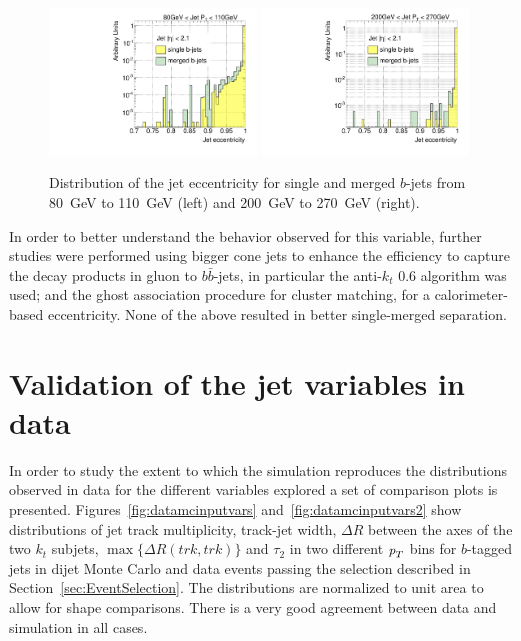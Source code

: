 \begin{figure}[tp]
\centering
\includegraphics[width=0.49\textwidth]{FIGS/VarsSingleMerged/JetEcc080.pdf}
\includegraphics[width=0.49\textwidth]{FIGS/VarsSingleMerged/JetEcc200.pdf}
\caption{Distribution of the jet eccentricity for single and merged $b$-jets from 80~GeV to 110~GeV (left) and 200~GeV to 270~GeV (right).}
\label{fig:jeteccsinglemerged}
\end{figure}


In order to better understand the behavior observed for this variable, further studies were performed using bigger cone jets to enhance the efficiency to capture the decay products in gluon to $b \bar{b}$-jets, in particular the anti-$k_t$ 0.6 algorithm was used; and the ghost association procedure for cluster matching, for a calorimeter-based eccentricity. None of the above resulted in better single-merged separation.






\section{Validation of the jet variables in data}\label{sec:gbbValidation}

 In order to study the extent to which the simulation reproduces the distributions observed in data for the different variables explored a set of comparison plots is presented. Figures~\ref{fig:datamcinputvars} and~\ref{fig:datamcinputvars2} show distributions of jet track multiplicity, track-jet width, $\Delta R$ between the axes of the two $k_t$ subjets, $\max\{\Delta R(trk,trk)\}$ and $\tau_2$ in two different ${\emph{p}_{T}}$ bins for $b$-tagged jets in dijet Monte Carlo and data events passing the selection described in Section~\ref{sec:EventSelection}.
The distributions are normalized to unit area to allow for shape comparisons. There is a very good agreement between data and simulation in all cases.

